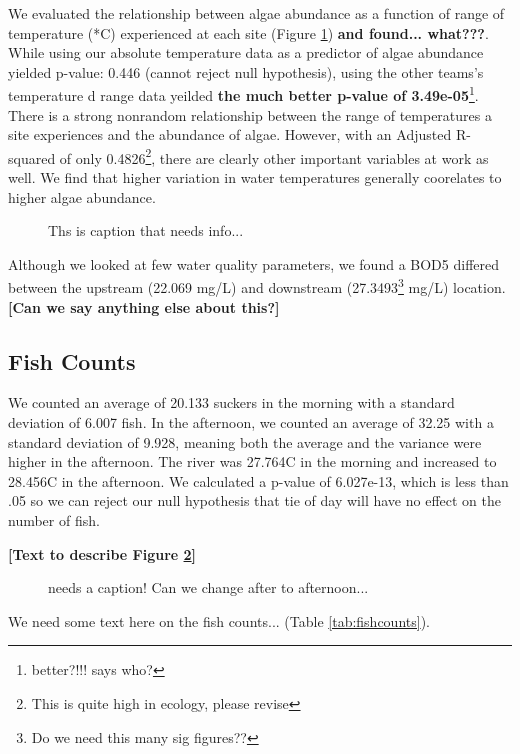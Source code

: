 \documentclass{article}
\begin{document}
We evaluated the relationship between algae abundance as a function of range of temperature (*C) experienced at each site (Figure \ref{fig:tempalgae}) \textbf{and found... what???}. While using our absolute temperature data as a predictor of algae abundance yielded p-value: 0.446 (cannot reject null hypothesis), using the other teams's temperature d range data yeilded \textbf{the much better p-value of 3.49e-05}\footnote{better?!!! says who?}. There is a strong nonrandom relationship between the range of temperatures a site experiences and the abundance of algae. However, with an Adjusted R-squared of only 0.4826\footnote{This is quite high in ecology, please revise}, there are clearly other important variables at work as well. We find that higher variation in water temperatures generally coorelates to higher algae abundance. 
\begin{figure}[!ht]
\caption{Ths is caption that needs info...}
\label{fig:tempalgae}
\end{figure}


Although we looked at few water quality parameters, we found a BOD5 differed between the upstream (22.069 mg/L) and downstream (27.3493\footnote{Do we need this many sig figures??} mg/L) location. \textbf{[Can we say anything else about this?]}

\subsection{Fish Counts}

We counted an average of 20.133 suckers in the morning with a standard deviation of 6.007 fish.  In the afternoon, we counted an average of 32.25 with a standard deviation of 9.928, meaning both the average and the variance were higher in the afternoon.  The river was 27.764\textdegree C in the morning and increased to 28.456\textdegree C in the afternoon.  We calculated a p-value of 6.027e-13, which is less than .05 so we can reject our null hypothesis that tie of day will have no effect on the number of fish.


\textbf{[Text to describe Figure \ref{fig:fishsection}]}

\begin{figure}[!ht]
\caption{needs a caption! Can we change after to afternoon...}
\label{fig:fishsection}
\end{figure}

We need some text here on the fish counts... (Table \ref{tab:fishcounts}).
\end{document}
